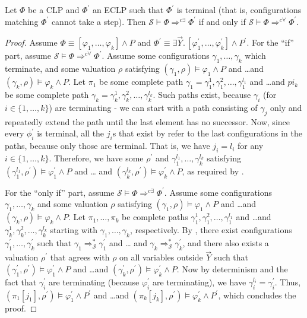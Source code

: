 \begin{lemma}
    Let $\Phi$ be a CLP and $\Phi^\prime$ an ECLP such that $\Phi^\prime$ is terminal
    (that is, configurations matching $\Phi^\prime$ cannot take a step).
    Then $\mathcal{S} \vDash \Phi \Rightarrow^{c\exists} \Phi^\prime$
    if and only if $\mathcal{S} \vDash \Phi \Rightarrow^{c\forall} \Phi^\prime$.
\end{lemma}
\begin{proof}
Assume $\Phi \equiv [\varphi_1,\ldots,\varphi_k] \land P$
and $\Phi^\prime \equiv \exists \vec{Y}.\, [\varphi^\prime_1,\ldots,\varphi^\prime_k] \land P^\prime$.
For the ``if'' part, assume $\mathcal{S} \vDash \Phi \Rightarrow^{c\forall} \Phi^\prime$.
Assume some configurations $\gamma_1,\ldots,\gamma_k$ which terminate, and some valuation $\rho$
satisfying $(\gamma_1,\rho) \vDash \varphi_1 \land P$ and \ldots and $(\gamma_k,\rho) \vDash \varphi_k \land P$.
Let $\pi_1$ be some complete path $\gamma_1 = \gamma_1^1,\gamma_1^2,\ldots,\gamma_1^{l_1}$
and \ldots and $pi_k$ be some complete path $\gamma_k = \gamma_k^1,\gamma_k^2,\ldots,\gamma_k^{l_k}$.
Such paths exist, because $\gamma_i$ (for $i \in \{1, \ldots, k \}$) are terminating
- we can start with a path consisting of $\gamma_j$ only and repeatedly extend the path until the last element has no successor.
Now, since every $\phi_i^\prime$ is terminal, all the $j_i$s that exist by 
refer to the last configurations in the paths, because only those are terminal.
That is, we have $j_i = l_i$ for any $i \in \{ 1, \ldots, k \}$.
Therefore, we have some $\rho^\prime$ and $\gamma_1^{l_1}, \ldots, \gamma_k^{l_k}$ satisfying
$(\gamma_1^{l_1}, \rho^\prime) \vDash \varphi^\prime_1 \land P$ and \ldots
and $(\gamma_k^{l_k}, \rho^\prime) \vDash \varphi^\prime_k \land P$,
as required by .

For the ``only if'' part, assume $\mathcal{S} \vDash \Phi \Rightarrow^{c\exists} \Phi^\prime$.
Assume some configurations $\gamma_1,\ldots,\gamma_k$ and some valuation $\rho$
satisfying $(\gamma_1,\rho) \vDash \varphi_1 \land P$ and \ldots and $(\gamma_k,\rho) \vDash \varphi_k \land P$.
Let $\pi_1, \ldots, \pi_k$ be complete paths
$\gamma_1^1,\gamma_1^2,\ldots,\gamma_1^{l_1}$ and \ldots and $\gamma_k^1,\gamma_k^2,\ldots,\gamma_k^{l_k}$
starting with $\gamma_1,\ldots,\gamma_k$, respectively.
By , there exist configurations $\gamma_1^\prime,\ldots,\gamma_k^\prime$
such that $\gamma_1 \Rightarrow_{\mathcal{S}}^* \gamma^\prime_1$
and \ldots
and $\gamma_k \Rightarrow_{\mathcal{S}}^* \gamma^\prime_k$,
and there also exists a valuation $\rho^\prime$
that agrees with $\rho$ on all variables outside $\vec{Y}$
such that
$(\gamma^\prime_1, \rho^\prime) \vDash \varphi^\prime_1 \land P$
and \ldots and
$(\gamma^\prime_k, \rho^\prime) \vDash \varphi^\prime_k \land P$.
Now by determinism and the fact that $\gamma^\prime_i$ are terminating (because $\varphi^\prime_i$ are terminating), we have
$\gamma^{l_i}_i = \gamma^\prime_i$.
Thus,
$(\pi_1[j_1], \rho^\prime) \vDash \varphi^\prime_1 \land P^\prime$
and \ldots and $(\pi_k[j_k], \rho^\prime) \vDash \varphi^\prime_k \land P^\prime$,
which concludes the proof.

\end{proof}